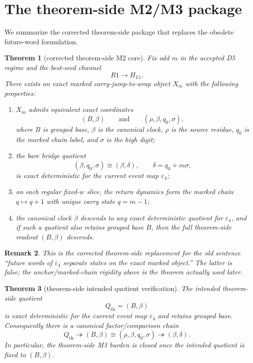 \documentclass[11pt]{article}
\newtheorem{theorem}{Theorem}[section]
\newtheorem{remark}[theorem]{Remark}
\newcommand{\eps}{\varepsilon}
\begin{document}
\section{The theorem-side M2/M3 package}

We summarize the corrected theorem-side package that replaces the obsolete
future-word formulation.

\begin{theorem}[corrected theorem-side M2 core]
\label{thm:corrected-M2-core}
Fix odd $m$ in the accepted D5 regime and the best-seed channel
\[
R1\to H_{L1}.
\]
There exists an exact marked carry-jump-to-wrap object $X_m$ with the following
properties:
\begin{enumerate}[label=\textup{(M2\arabic*)},leftmargin=2.9em]
\item $X_m$ admits equivalent exact coordinates
      \[
      (B,\beta)
      \qquad\text{and}\qquad
      (\rho,\beta,q_0,\sigma),
      \]
      where $B$ is grouped base, $\beta$ is the canonical clock, $\rho$ is the
      source residue, $q_0$ is the marked chain label, and $\sigma$ is the high
      digit;
\item the bare bridge quotient
      \[
      (\beta,q_0,\sigma)\cong(\beta,\delta),
      \qquad
      \delta=q_0+m\sigma,
      \]
      is exact deterministic for the current event map $\eps_4$;
\item on each regular fixed-$w$ slice, the return dynamics form the marked
      chain $q\mapsto q+1$ with unique carry state $q=m-1$;
\item the canonical clock $\beta$ descends to any exact deterministic quotient
      for $\eps_4$, and if such a quotient also retains grouped base $B$, then
      the full theorem-side readout $(B,\beta)$ descends.
\end{enumerate}
\end{theorem}

\begin{remark}
This is the corrected theorem-side replacement for the old sentence ``future
words of $\eps_4$ separate states on the exact marked object.'' The latter is
false; the anchor/marked-chain rigidity above is the theorem actually used
later.
\end{remark}

\begin{theorem}[theorem-side intended quotient verification]
\label{thm:Qth-verification}
The intended theorem-side quotient
\[
Q_{\mathrm{th}}=(B,\beta)
\]
is exact deterministic for the current event map $\eps_4$ and retains grouped
base. Consequently there is a canonical factor/comparison chain
\[
Q_{\mathrm{th}}
\twoheadrightarrow
(B,\beta)
\cong
(\rho,\beta,q_0,\sigma)
\twoheadrightarrow
(\beta,\delta).
\]
In particular, the theorem-side M3 burden is closed once the intended quotient
is fixed to $(B,\beta)$.
\end{theorem}
\end{document}
